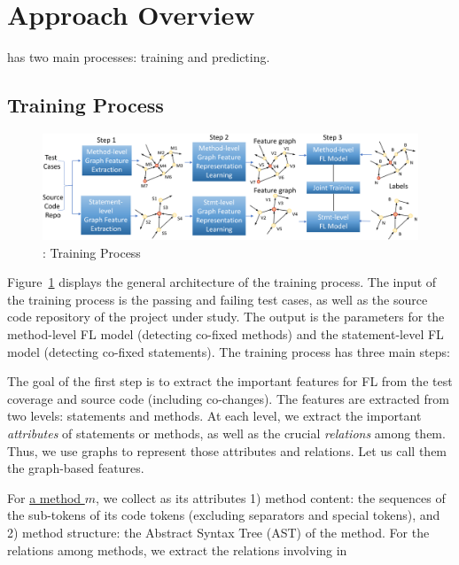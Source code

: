 \section{Approach Overview}
\label{overview:sec}

{\tool} has two main processes: training and predicting.

\subsection{Training Process}

\begin{figure}[t]
	\centering
	\includegraphics[width=5.6in]{graphs/overview-training.png}
	\caption{{\tool}: Training Process}
	\label{train-overview}
\end{figure}

Figure~\ref{train-overview} displays the general architecture of the training process. The input of the training process is the passing and failing test cases, as well as the
source code repository of the project under study. The output is the parameters for the method-level FL model (detecting co-fixed methods) and the statement-level FL model (detecting co-fixed statements). The training process has three main steps:

\vspace{3pt}
The goal of the first step is to extract the important features for FL
from the test coverage and source code (including co-changes). The
features are extracted from two levels: statements and methods. At
each level, we extract the important {\em attributes} of statements or
methods, as well as the crucial {\em relations} among them. Thus, we
use graphs to represent those attributes and relations. Let us call
them the graph-based features.

For \underline{a method $m$}, we collect as its attributes 1) method
content: the sequences of the sub-tokens of its code tokens (excluding
separators and special tokens), and 2) method structure: the Abstract
Syntax Tree (AST) of the method. For the relations among methods, we
extract the relations involving in

